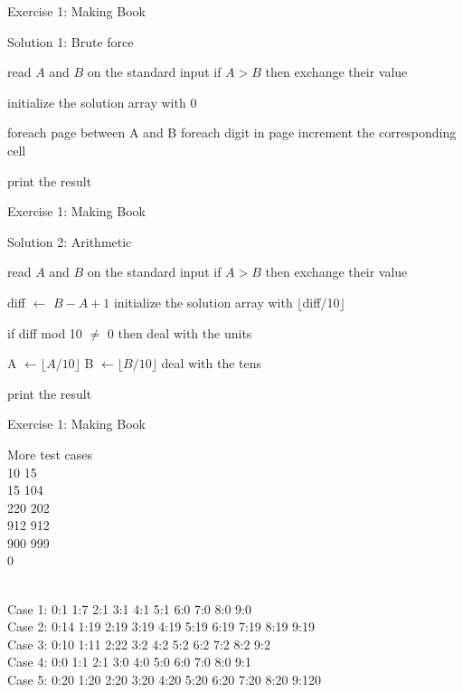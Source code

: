 \documentclass{beamer}
\begin{document}
\begin{frame}[fragile]{Exercise 1: Making Book}

  \begin{code}{Solution 1: Brute force}
    \begin{PseudoCode}
read $A$ and $B$ on the standard input
if $A > B$ then
    exchange their value

initialize the solution array with 0

foreach page between A and B
    foreach digit in page
        increment the corresponding cell

print the result
    \end{PseudoCode}
  \end{code}
\end{frame}

\begin{frame}[fragile]{Exercise 1: Making Book}

  \begin{code}{Solution 2: Arithmetic}
    \begin{PseudoCode}
read $A$ and $B$ on the standard input
if $A > B$ then exchange their value

diff $\leftarrow$ $B - A + 1$
initialize the solution array with $\lfloor$diff/10$\rfloor$

if diff mod 10 $\neq$ 0 then
    deal with the units

A $\leftarrow \lfloor A / 10 \rfloor$
B $\leftarrow \lfloor B / 10 \rfloor$
deal with the tens

print the result
    \end{PseudoCode}
  \end{code}
\end{frame}

\begin{frame}{Exercise 1: Making Book}

  \begin{exampleblock}{More test cases}
    \\
    10 15\\
    15 104\\
    220 202\\
    912 912\\
    900 999\\
    0

    \medskip
    \\
    Case 1: 0:1 1:7 2:1 3:1 4:1 5:1 6:0 7:0 8:0 9:0\\
    Case 2: 0:14 1:19 2:19 3:19 4:19 5:19 6:19 7:19 8:19 9:19\\
    Case 3: 0:10 1:11 2:22 3:2 4:2 5:2 6:2 7:2 8:2 9:2\\
    Case 4: 0:0 1:1 2:1 3:0 4:0 5:0 6:0 7:0 8:0 9:1\\
    Case 5: 0:20 1:20 2:20 3:20 4:20 5:20 6:20 7:20 8:20 9:120
  \end{exampleblock}
\end{frame}
\end{document}
